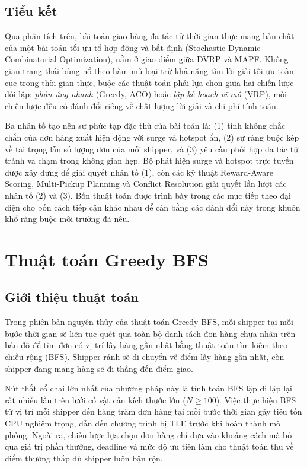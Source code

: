 \documentclass[conference]{IEEEtran}
\begin{document}
\subsection{Tiểu kết}
Qua phân tích trên, bài toán giao hàng đa tác tử thời gian thực mang bản chất của một bài toán tối ưu tổ hợp động và bất định (Stochastic Dynamic Combinatorial Optimization), nằm ở giao điểm giữa DVRP và MAPF. Không gian trạng thái bùng nổ theo hàm mũ loại trừ khả năng tìm lời giải tối ưu toàn cục trong thời gian thực, buộc các thuật toán phải lựa chọn giữa hai chiến lược đối lập: \textit{phản ứng nhanh} (Greedy, ACO) hoặc \textit{lập kế hoạch vĩ mô} (VRP), mỗi chiến lược đều có đánh đổi riêng về chất lượng lời giải và chi phí tính toán.
 
Ba nhân tố tạo nên sự phức tạp đặc thù của bài toán là: (1) tính không chắc chắn của đơn hàng xuất hiện động với surge và hotspot ẩn, (2) sự ràng buộc kép về tải trọng lẫn số lượng đơn của mỗi shipper, và (3) yêu cầu phối hợp đa tác tử tránh va chạm trong không gian hẹp. Bộ phát hiện surge và hotspot trực tuyến được xây dựng để giải quyết nhân tố (1), còn các kỹ thuật Reward-Aware Scoring, Multi-Pickup Planning và Conflict Resolution giải quyết lần lượt các nhân tố (2) và (3). Bốn thuật toán được trình bày trong các mục tiếp theo đại diện cho bốn cách tiếp cận khác nhau để cân bằng các đánh đổi này trong khuôn khổ ràng buộc môi trường đã nêu.

\section{Thuật toán Greedy BFS}
 
\subsection{Giới thiệu thuật toán}
Trong phiên bản nguyên thủy của thuật toán Greedy BFS, mỗi shipper tại mỗi bước thời gian sẽ liên tục quét qua toàn bộ danh sách đơn hàng chưa nhận trên bản đồ để tìm đơn có vị trí lấy hàng gần nhất bằng thuật toán tìm kiếm theo chiều rộng (BFS). Shipper rảnh sẽ di chuyển về điểm lấy hàng gần nhất, còn shipper đang mang hàng sẽ đi thẳng đến điểm giao.
 
Nút thắt cổ chai lớn nhất của phương pháp này là tính toán BFS lặp đi lặp lại rất nhiều lần trên lưới có vật cản kích thước lớn ($N \ge 100$). Việc thực hiện BFS từ vị trí mỗi shipper đến hàng trăm đơn hàng tại mỗi bước thời gian gây tiêu tốn CPU nghiêm trọng, dẫn đến chương trình bị TLE trước khi hoàn thành mô phỏng. Ngoài ra, chiến lược lựa chọn đơn hàng chỉ dựa vào khoảng cách mà bỏ qua giá trị phần thưởng, deadline và mức độ ưu tiên làm cho thuật toán thu về điểm thưởng thấp dù shipper luôn bận rộn.
 
\end{document}
